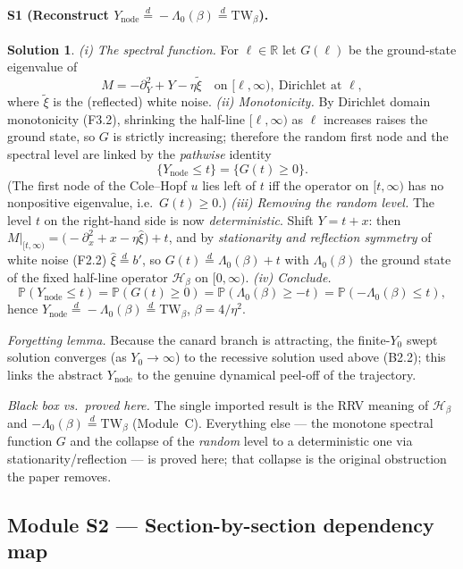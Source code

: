\documentclass[11pt]{article}
\newcommand{\eqd}{\stackrel{d}{=}}
\newcommand{\TW}{\mathrm{TW}}
\newcommand{\R}{\mathbb{R}}
\renewcommand{\Pr}{\mathbb{P}}
\newcommand{\Ynode}{Y_{\mathrm{node}}}
\newcommand{\Lam}{\Lambda_0}
\theoremstyle{definition}
\newtheorem*{sol}{Solution}
\begin{document}
\paragraph{S1 (Reconstruct $\Ynode\eqd-\Lam(\beta)\eqd\TW_\beta$).}
\begin{sol}
\emph{(i) The spectral function.} For $\ell\in\R$ let $G(\ell)$ be the ground-state eigenvalue of
\[
M=-\partial_Y^2+Y-\eta\tilde\xi\quad\text{on }[\ell,\infty),\ \text{Dirichlet at }\ell,
\]
where $\tilde\xi$ is the (reflected) white noise. \emph{(ii) Monotonicity.} By Dirichlet domain
monotonicity (F3.2), shrinking the half-line $[\ell,\infty)$ as $\ell$ increases raises the ground
state, so $G$ is strictly increasing; therefore the random first node and the spectral level are
linked by the \emph{pathwise} identity
\[
\{\Ynode\le t\}=\{G(t)\ge0\}.
\]
(The first node of the Cole--Hopf $u$ lies left of $t$ iff the operator on $[t,\infty)$ has no
nonpositive eigenvalue, i.e.\ $G(t)\ge0$.) \emph{(iii) Removing the random level.} The level $t$
on the right-hand side is now \emph{deterministic}. Shift $Y=t+x$: then
$M|_{[t,\infty)}=\bigl(-\partial_x^2+x-\eta\hat\xi\bigr)+t$, and by \emph{stationarity and
reflection symmetry} of white noise (F2.2) $\hat\xi\eqd b'$, so
$G(t)\eqd\Lam(\beta)+t$ with $\Lam(\beta)$ the ground state of the fixed half-line operator
$\mathcal H_\beta$ on $[0,\infty)$. \emph{(iv) Conclude.}
\[
\Pr(\Ynode\le t)=\Pr(G(t)\ge0)=\Pr(\Lam(\beta)\ge-t)=\Pr(-\Lam(\beta)\le t),
\]
hence $\Ynode\eqd-\Lam(\beta)\eqd\TW_\beta$, $\beta=4/\eta^2$.

\smallskip\emph{Forgetting lemma.} Because the canard branch is attracting, the finite-$Y_0$ swept
solution converges (as $Y_0\to\infty$) to the recessive solution used above (B2.2); this links the
abstract $\Ynode$ to the genuine dynamical peel-off of the trajectory.

\smallskip\emph{Black box vs.\ proved here.} The single imported result is the RRV meaning of
$\mathcal H_\beta$ and $-\Lam(\beta)\eqd\TW_\beta$ (Module~C). Everything else --- the monotone
spectral function $G$ and the collapse of the \emph{random} level to a deterministic one via
stationarity/reflection --- is proved here; that collapse is the original obstruction the paper
removes.
\end{sol}

\subsection*{Module S2 --- Section-by-section dependency map}
\end{document}
